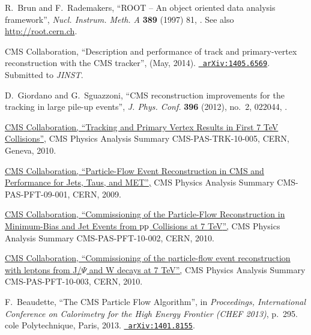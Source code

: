 \documentclass[12pt]{thesis}  %
\newcommand{\Pp}{\ensuremath{\cmsSymbolFace{p}}\xspace}
\begin{document}
\begin{thebibliography}{100}
\hrefCMSnoop {} {R.~Brun and F.~Rademakers, ``{ROOT} -- An object oriented data
  analysis framework'',} \textit{ Nucl. Instrum. Meth. A} \textbf{ 389} (1997)
  81,
  \href{http://dx.doi.org/10.1016/S0168-9002(97)00048-X}{}.
  See also \url{http://root.cern.ch}.

\hrefCMSnoop {} {{ CMS} Collaboration, ``{Description and performance of track
  and primary-vertex reconstruction with the CMS tracker}'',} (May, 2014).
  \href{http://www.arXiv.org/abs/1405.6569}{\texttt{ arXiv:1405.6569}}.
  Submitted to \emph{JINST}.

\hrefCMSnoop {} {D.~Giordano and G.~Sguazzoni, ``CMS reconstruction
  improvements for the tracking in large pile-up events'',} \textit{ J. Phys.
  Conf.} \textbf{ 396} (2012), no.~2, 022044,
  \href{http://dx.doi.org/10.1088/1742-6596/396/2/022044}{}.

\href {http://cds.cern.ch/record/1279383/} {{ CMS} Collaboration, ``{Tracking
  and Primary Vertex Results in First 7 TeV Collisions}'',} CMS Physics
  Analysis Summary CMS-PAS-TRK-10-005, CERN, Geneva, 2010.

\href {http://cds.cern.ch/record/1194487} {{ CMS} Collaboration,
  ``Particle-Flow Event Reconstruction in CMS and Performance for Jets, Taus,
  and MET'',} CMS Physics Analysis Summary CMS-PAS-PFT-09-001, CERN, 2009.

\href {http://cdsweb.cern.ch/record/1279341} {{ CMS} Collaboration,
  ``Commissioning of the Particle-Flow Reconstruction in Minimum-Bias and Jet
  Events from {$\Pp\Pp$} Collisions at 7 {TeV}'',} CMS Physics Analysis Summary
  CMS-PAS-PFT-10-002, CERN, 2010.

\href {http://cdsweb.cern.ch/record/1279347} {{ CMS} Collaboration,
  ``Commissioning of the particle-flow event reconstruction with leptons from
  {J}/$\Psi$ and {W} decays at 7 {TeV}'',} CMS Physics Analysis Summary
  CMS-PAS-PFT-10-003, CERN, 2010.

\hrefCMSnoop {} {F.~Beaudette, ``{The CMS Particle Flow Algorithm}'',} in
  \textit{ {Proceedings, International Conference on Calorimetry for the High
  Energy Frontier (CHEF 2013)}}, p.~295.
cole Polytechnique, Paris, 2013.
\newblock
\href{http://www.arXiv.org/abs/1401.8155}{\texttt{ arXiv:1401.8155}}.
\newblock


\end{thebibliography}
\end{document}

